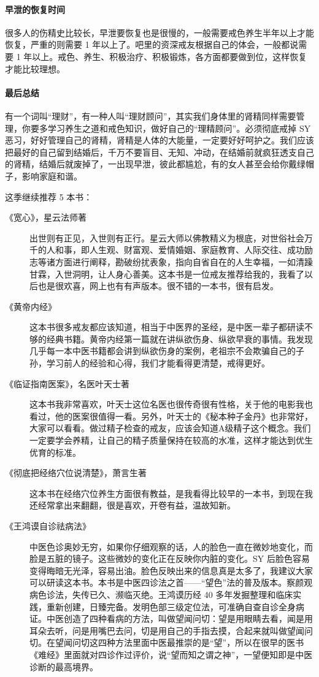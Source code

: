 \documentclass{ctexart}
\begin{document}
\paragraph{早泄的恢复时间}

很多人的伤精史比较长，早泄要恢复也是很慢的，一般需要戒色养生半年以上才能恢复，严重的则需要 1 年以上了。吧里的资深戒友根据自己的体会，一般都说需要 1 年以上。戒色、养生、积极治疗、积极锻炼，各方面都要做到位，这样恢复才能比较理想。

\paragraph{最后总结}

有一个词叫“理财”，有一种人叫“理财顾问”，其实我们身体里的肾精同样需要管理，你要多学习养生之道和戒色知识，做好自己的“理精顾问”。必须彻底戒掉 SY 恶习，好好管理自己的肾精，肾精是人体的大能量，一定要好好呵护之。我们应该把最好的自己留到结婚后，千万不要盲目、无知、冲动，在结婚前就疯狂透支自己的肾精，结婚后就废掉了，一出现早泄，彼此都尴尬，有的女人甚至会给你戴绿帽子，影响家庭和谐。

这季继续推荐 5 本书：

\begin{description}
   \item[《宽心》，星云法师著] 出世则有正见，入世则有正行。星云大师以佛教精义为根底，对世俗社会万千的人和事，即人生观、财富观、爱情婚姻、家庭教育、人际交往、成功励志等诸方面进行阐释，勘破纷扰表象，指向自省自在的人生幸福，一如清躁甘霖，入世洞明，让人身心善美。这本书是一位戒友推荐给我的，我看了以后也是很欢喜，网上也有有声版本。很不错的一本书，很有启发。
    \item[《黄帝内经》] 这本书很多戒友都应该知道，相当于中医界的圣经，是中医一辈子都研读不够的经典书籍。黄帝内经第一篇就在讲纵欲伤身、纵欲早衰的事情。我发现几乎每一本中医书籍都会讲到纵欲伤身的案例，老祖宗不会欺骗自己的子孙，学习前人的经验和心得，我们才能看得更清楚，戒得更好。
    \item[《临证指南医案》，名医叶天士著] 这本书我非常喜欢，叶天士这位名医也很传奇很有性格，关于他的电影我也看过，他的医案很值得一看。另外，叶天士的《秘本种子金丹》也非常好，大家可以看看。做过精子检查的戒友，应该会知道A级精子这个概念。我们一定要学会养精，让自己的精子质量保持在较高的水准，这样才能达到优生优育的标准。
    \item[《彻底把经络穴位说清楚》，萧言生著] 这本书在经络穴位养生方面很有教益，是我看得比较早的一本书，到现在我还经常拿出来翻翻，很是喜欢，开卷有益，温故知新。
    \item[《王鸿谟自诊祛病法》] 中医色诊奥妙无穷，如果你仔细观察的话，人的脸色一直在微妙地变化，而脸是五脏的镜子。这些微妙的变化正在反映你内脏的变化。SY 后脸色容易变得晦暗无光泽，容易出油。脸色反映出来的信息真是太多了，我建议大家可以研读这本书。本书是中医四诊法之首——“望色”法的普及版本。察颜观病色诊法，失传已久、濒临灭绝。王鸿谟历经 40 多年发掘整理和临床实践，重新创建，日臻完备。发明色部三级定位法，可准确自查自诊全身病证。中医创造了四种看病的方法，叫做望闻问切：望是用眼睛去看，闻是用耳朵去听，问是用嘴巴去问，切是用自己的手指去摸，合起来就叫做望闻问切。在望闻问切这四种方法里面中医最推崇的是“望”，所以在很早的医书《难经》里面就对四诊作过评价，说“望而知之谓之神”，一望便知即是中医诊断的最高境界。
\end{description}
\end{document}
